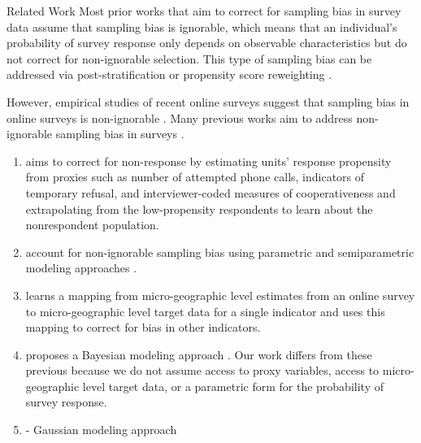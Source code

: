 \begin{subsection}{Related Work} 
	Most prior works that aim to correct for sampling bias in survey data assume that sampling bias is ignorable, which means that an individual's probability of survey response only depends on observable characteristics but do not correct for non-ignorable selection. This type of sampling bias can be addressed via post-stratification \citep{groves2008impact, groves2011survey, little1993post}  or propensity score reweighting \citep{david1983imputation,rosenbaum1983central,seaman2013review}.

	However, empirical studies of recent online surveys suggest that sampling bias in online surveys is non-ignorable \citep{bradley2021unrepresentative, kessler2022estimated}. Many previous works aim to address non-ignorable sampling bias in surveys \citep{andridge2011proxy, greenlees1982imputation, little2020measures, manski2016credible, qin2002estimation, peress2010correcting, reitsma2022bias, wisniowski2020integrating}. 

\begin{enumerate}
    \item \citet{peress2010correcting} aims to correct for non-response by estimating units' response propensity from proxies such as number of attempted phone calls, indicators of temporary refusal, and interviewer-coded measures of cooperativeness and extrapolating from the low-propensity respondents to learn about the nonrespondent population. 

    \item \citet{greenlees1982imputation,qin2002estimation} account for non-ignorable sampling bias using parametric and semiparametric modeling approaches . 

    \item \citet{reitsma2022bias} learns a mapping from micro-geographic level estimates from an online survey to micro-geographic level target data for a single indicator and uses this mapping to correct for bias in other indicators. 

    \item \citet{wisniowski2020integrating} proposes a Bayesian modeling approach . Our work differs from these previous because we do not assume access to proxy variables, access to micro-geographic level target data, or a parametric form for the probability of survey response.

    \item \citet{andridge2011proxy,little2020measures} - Gaussian modeling approach


\end{enumerate}
\end{subsection}
